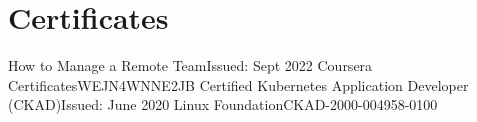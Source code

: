 \section{Certificates}
  \resumeSubHeadingListStart
    \resumeSubheading
      {How to Manage a Remote Team}{Issued: Sept 2022}
      {Coursera Certificates}{WEJN4WNNE2JB}
    \resumeSubheading
      {Certified Kubernetes Application Developer (CKAD)}{Issued: June 2020}
      {Linux Foundation}{CKAD-2000-004958-0100}
  \resumeSubHeadingListEnd
